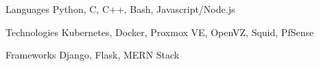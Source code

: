 
\begin{cvskills}
  \cvskill
    {Languages} %
    {Python, C, C++, Bash, Javascript/Node.js} %

  \cvskill
    {Technologies} %
    {Kubernetes, Docker, Proxmox VE, OpenVZ, Squid, PfSense} %

  \cvskill
	{Frameworks} %
	{Django, Flask, MERN Stack} %
\end{cvskills}

